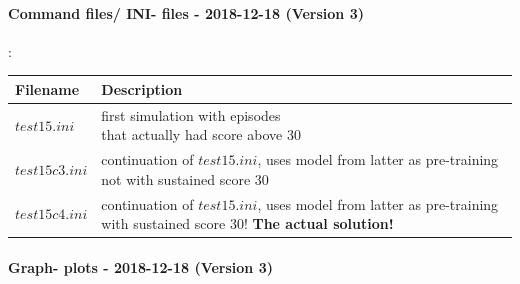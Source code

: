 \documentclass[a4paper]{article}
\begin{document}
\paragraph{Command files/ INI- files - 2018-12-18 (Version 3)}
:\\
\begin{tabular}{ |l|l| }
  \hline
Filename & Description \\
  \hline
$test15.ini$ & \makecell[tl]{first simulation with episodes \\ that actually had score above 30} \\
$test15c3.ini$ & \makecell[tl]{continuation of $test15.ini$, uses model \\ from latter as pre-training \\ not with sustained score 30} \\
$test15c4.ini$ & \makecell[tl]{continuation of $test15.ini$, uses model \\ from latter as pre-training \\ with sustained score 30! \\ \textbf{The actual solution!}} \\
  \hline
\end{tabular}

\paragraph{Graph- plots - 2018-12-18 (Version 3)}
\end{document}
